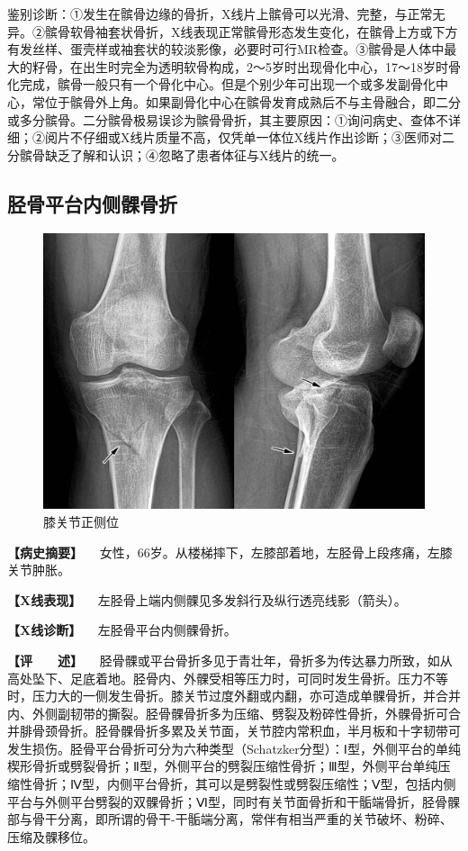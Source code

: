 鉴别诊断：①发生在髌骨边缘的骨折，X线片上髌骨可以光滑、完整，与正常无异。②髌骨软骨袖套状骨折，X线表现正常髌骨形态发生变化，在髌骨上方或下方有发丝样、蛋壳样或袖套状的较淡影像，必要时可行MR检查。③髌骨是人体中最大的籽骨，在出生时完全为透明软骨构成，2～5岁时出现骨化中心，17～18岁时骨化完成，髌骨一般只有一个骨化中心。但是个别少年可出现一个或多发副骨化中心，常位于髌骨外上角。如果副骨化中心在髌骨发育成熟后不与主骨融合，即二分或多分髌骨。二分髌骨极易误诊为髌骨骨折，其主要原因：①询问病史、查体不详细；②阅片不仔细或X线片质量不高，仅凭单一体位X线片作出诊断；③医师对二分髌骨缺乏了解和认识；④忽略了患者体征与X线片的统一。

\subsection{胫骨平台内侧髁骨折}

\begin{figure}[!htbp]
 \centering
 \includegraphics{./images/Image00047.jpg}
 \captionsetup{justification=centering}
 \caption{膝关节正侧位}
 \label{fig2-3-20}
  \end{figure} 

\textbf{【病史摘要】}
　女性，66岁。从楼梯摔下，左膝部着地，左胫骨上段疼痛，左膝关节肿胀。

\textbf{【X线表现】}
　左胫骨上端内侧髁见多发斜行及纵行透亮线影（箭头）。

\textbf{【X线诊断】} 　左胫骨平台内侧髁骨折。

\textbf{【评　　述】}
　胫骨髁或平台骨折多见于青壮年，骨折多为传达暴力所致，如从高处坠下、足底着地。胫骨内、外髁受相等压力时，可同时发生骨折。压力不等时，压力大的一侧发生骨折。膝关节过度外翻或内翻，亦可造成单髁骨折，并合并内、外侧副韧带的撕裂。胫骨髁骨折多为压缩、劈裂及粉碎性骨折，外髁骨折可合并腓骨颈骨折。胫骨髁骨折多累及关节面，关节腔内常积血，半月板和十字韧带可发生损伤。胫骨平台骨折可分为六种类型（Schatzker分型）：Ⅰ型，外侧平台的单纯楔形骨折或劈裂骨折；Ⅱ型，外侧平台的劈裂压缩性骨折；Ⅲ型，外侧平台单纯压缩性骨折；Ⅳ型，内侧平台骨折，其可以是劈裂性或劈裂压缩性；Ⅴ型，包括内侧平台与外侧平台劈裂的双髁骨折；Ⅵ型，同时有关节面骨折和干骺端骨折，胫骨髁部与骨干分离，即所谓的骨干-干骺端分离，常伴有相当严重的关节破坏、粉碎、压缩及髁移位。

